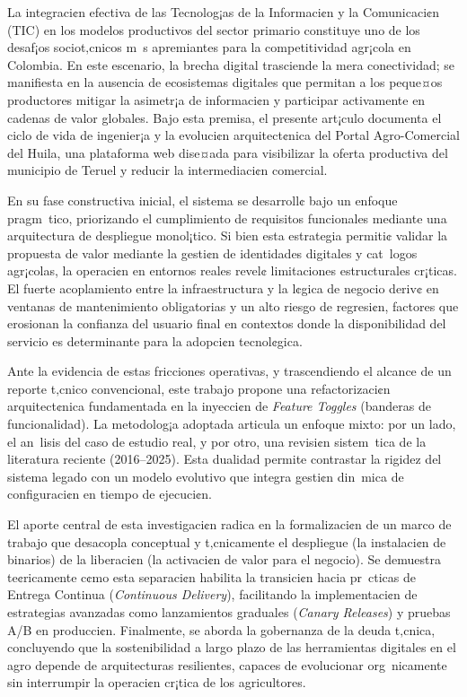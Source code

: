 La integraci¢n efectiva de las Tecnolog¡as de la Informaci¢n y la Comunicaci¢n (TIC) en los modelos productivos del sector primario constituye uno de los desaf¡os sociot‚cnicos m s apremiantes para la competitividad agr¡cola en Colombia. En este escenario, la brecha digital trasciende la mera conectividad; se manifiesta en la ausencia de ecosistemas digitales que permitan a los peque¤os productores mitigar la asimetr¡a de informaci¢n y participar activamente en cadenas de valor globales. Bajo esta premisa, el presente art¡culo documenta el ciclo de vida de ingenier¡a y la evoluci¢n arquitect¢nica del Portal Agro-Comercial del Huila, una plataforma web dise¤ada para visibilizar la oferta productiva del municipio de Teruel y reducir la intermediaci¢n comercial.

En su fase constructiva inicial, el sistema se desarroll¢ bajo un enfoque pragm tico, priorizando el cumplimiento de requisitos funcionales mediante una arquitectura de despliegue monol¡tico. Si bien esta estrategia permiti¢ validar la propuesta de valor mediante la gesti¢n de identidades digitales y cat logos agr¡colas, la operaci¢n en entornos reales revel¢ limitaciones estructurales cr¡ticas. El fuerte acoplamiento entre la infraestructura y la l¢gica de negocio deriv¢ en ventanas de mantenimiento obligatorias y un alto riesgo de regresi¢n, factores que erosionan la confianza del usuario final en contextos donde la disponibilidad del servicio es determinante para la adopci¢n tecnol¢gica.

Ante la evidencia de estas fricciones operativas, y trascendiendo el alcance de un reporte t‚cnico convencional, este trabajo propone una refactorizaci¢n arquitect¢nica fundamentada en la inyecci¢n de \textit{Feature Toggles} (banderas de funcionalidad). La metodolog¡a adoptada articula un enfoque mixto: por un lado, el an lisis del caso de estudio real, y por otro, una revisi¢n sistem tica de la literatura reciente (2016--2025). Esta dualidad permite contrastar la rigidez del sistema legado con un modelo evolutivo que integra gesti¢n din mica de configuraci¢n en tiempo de ejecuci¢n.

El aporte central de esta investigaci¢n radica en la formalizaci¢n de un marco de trabajo que desacopla conceptual y t‚cnicamente el despliegue (la instalaci¢n de binarios) de la liberaci¢n (la activaci¢n de valor para el negocio). Se demuestra te¢ricamente c¢mo esta separaci¢n habilita la transici¢n hacia pr cticas de Entrega Continua (\textit{Continuous Delivery}), facilitando la implementaci¢n de estrategias avanzadas como lanzamientos graduales (\textit{Canary Releases}) y pruebas A/B en producci¢n. Finalmente, se aborda la gobernanza de la deuda t‚cnica, concluyendo que la sostenibilidad a largo plazo de las herramientas digitales en el agro depende de arquitecturas resilientes, capaces de evolucionar org nicamente sin interrumpir la operaci¢n cr¡tica de los agricultores.
